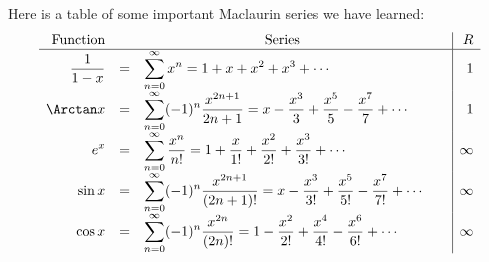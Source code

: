 \begin{frame}
Here is a table of some important Maclaurin series we have learned:
\[
\begin{array}{rcl@{\qquad}|r}
\textrm{Function} & \multicolumn{2}{c|}{\textrm{Series}} & R \\
\hline
\displaystyle \frac{1}{1-x} & = & \displaystyle \sum_{n=0}^\infty x^n = 1 + x + x^2 + x^3 + \cdots  & 1\\
\displaystyle \Arctan x & = & \displaystyle \sum_{n=0}^\infty (-1)^n \frac{x^{2n+1}}{2n+1} = x - \frac{x^3}{3} + \frac{x^5}{5} - \frac{x^7}{7} + \cdots  & 1\\
\displaystyle e^x & = & \displaystyle \sum_{n=0}^\infty \frac{x^n}{n!} = 1 + \frac{x}{1!} + \frac{x^2}{2!} + \frac{x^3}{3!} + \cdots  & \infty \\
\displaystyle \sin x & = & \displaystyle \sum_{n=0}^\infty (-1)^n \frac{x^{2n+1}}{(2n+1)!} = x - \frac{x^3}{3!} + \frac{x^5}{5!} - \frac{x^7}{7!} + \cdots  & \infty \\
\displaystyle \cos x & = & \displaystyle \sum_{n=0}^\infty (-1)^n \frac{x^{2n}}{(2n)!} = 1 - \frac{x^2}{2!} + \frac{x^4}{4!} - \frac{x^6}{6!} + \cdots  & \infty \\
\end{array}
\]
\end{frame}
